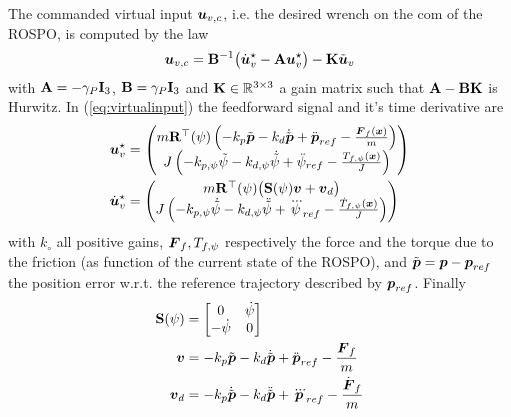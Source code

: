 The commanded virtual input $\boldsymbol{u}_{v,c}$, i.e. the desired wrench on the com of the ROSPO, is computed by the law
\begin{equation} \label{eq:virtualinput}
    \vett u_{v,c} = \matt B^{-1} \big( \dvett u_{v}^{\star} - \matt A \vett u_{v}^{\star}\big) - \matt K \tilde{\vett u}_{v}
\end{equation}
with $\mathbf{A} = -\gamma_{P} \mathbf{I}_{3}$, $\mathbf{B} = \gamma_{P} \mathbf{I}_{3}$ and $\mathbf{K}\in \mathbb R^{3\times 3}$ a gain matrix such that $\mathbf{A} - \mathbf{BK}$ is Hurwitz. In (\ref{eq:virtualinput}) the feedforward signal and it's time derivative are
\begin{align*}
\boldsymbol{u}_{v}^{\star} & = \begin{pmatrix}
    m \mathbf{R}^{\top}(\psi) \left( -k_{p} \tilde{\boldsymbol{p}} - k_{d}\dot{\tilde{\boldsymbol{p}}} + \ddot{\boldsymbol{p}}_{ref} - \frac{\boldsymbol{F}_{f}(\boldsymbol{x})}{m} \right) \\
    J \left( -k_{p, \psi} \tilde{\psi} - k_{d,\psi}\dot{\tilde{\psi}} + \ddot \psi_{ref} - \frac{T_{f,\psi}(\boldsymbol{x})}{J} \right)
\end{pmatrix} \\
\dot{\boldsymbol{u}}_{v}^{\star} & = \begin{pmatrix}
    m \mathbf{R}^{\top}(\psi) \big( \mathbf{S}(\psi) \boldsymbol{v} + \boldsymbol{v}_{d} \big) \\
    J \left( -k_{p, \psi} \dot{\tilde{\psi}} - k_{d,\psi}\ddot{\tilde{\psi}} + \dddot \psi_{ref} - \frac{\dot T_{f,\psi}(\boldsymbol{x})}{J} \right)
\end{pmatrix}
\end{align*}
with $k_{\circ}$ all positive gains, $\boldsymbol{F}_{f}, T_{f,\psi}$ respectively the force and the torque due to the friction (as function of the current state of the ROSPO), and $\tilde{\boldsymbol{p}} = \boldsymbol{p} - \boldsymbol{p}_{ref}$ the position error w.r.t. the reference trajectory described by $\boldsymbol{p}_{ref}$. Finally
\begin{align*}
\mathbf{S}(\psi) & = \begin{bmatrix}
    0 & \dot \psi \\ -\dot \psi & 0
\end{bmatrix} \\
    \boldsymbol{v} & = -k_{p} \tilde{\boldsymbol{p}} - k_{d} \dot{\tilde{\boldsymbol{p}}} + \ddot{\boldsymbol{p}}_{ref} - \frac{\boldsymbol{F}_{f}}{m} \\
    \boldsymbol{v}_{d} & = -k_{p} \dot{\tilde{\boldsymbol{p}}} - k_{d} \ddot{\tilde{\boldsymbol{p}}} + \dddot{\boldsymbol{p}}_{ref} - \frac{\dot{\boldsymbol{F}}_{f}}{m}
\end{align*}


